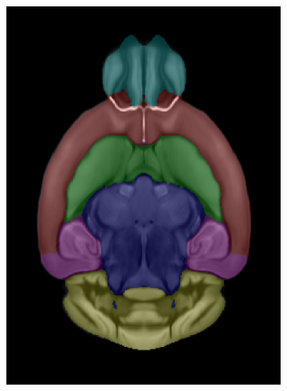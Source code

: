 \documentclass[
  12pt,
]{article}
\begin{document}
\begin{figure}
\centering
\begin{subfigure}{0.25\textwidth}
  \centering
  \includegraphics[width=\linewidth]{Figures/AllenCCFv3_parcellation_slice91.png}
  \caption{}
  \label{fig:subp_a}
\end{subfigure}
\begin{subfigure}{0.25\textwidth}
  \centering

\end{subfigure}
\end{figure}
\end{document}
